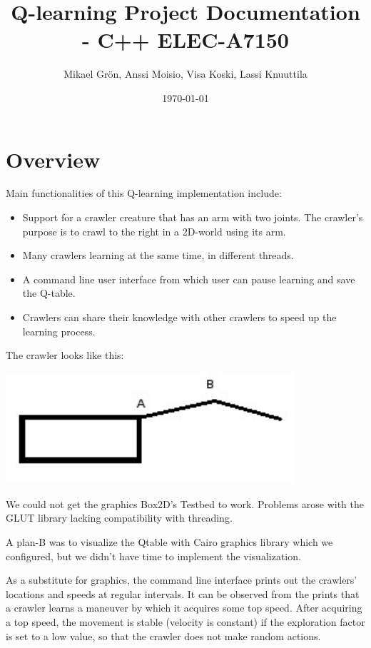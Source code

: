 \documentclass{article}
\author{Mikael Grön, Anssi Moisio, Visa Koski, Lassi Knuuttila}
\title{Q-learning Project Documentation - C++ ELEC-A7150}
\date{\today}
\begin{document}
\maketitle

\tableofcontents
\newpage

\section{Overview}
Main functionalities of this Q-learning implementation include:
\begin{itemize}
  \item Support for a crawler creature that has an arm with two joints. The
  crawler's purpose is to crawl to the right in a 2D-world using its arm.
  \item Many crawlers learning at the same time, in different threads.
  \item A command line user interface from which user can pause learning and
  save the Q-table.
  \item Crawlers can share their knowledge with other crawlers to speed up
  the learning process.
\end{itemize}

The crawler looks like this:

\includegraphics[width=0.8\textwidth]{simple_agent}

We could not get the graphics Box2D's Testbed to work. Problems arose with
the GLUT library lacking compatibility with threading.

A plan-B was to visualize the Qtable with Cairo graphics library which we
configured, but we didn't have time to implement the visualization.

As a substitute for graphics, the command line interface prints out the
crawlers’ locations and speeds at regular intervals. It can be observed
from the prints that a crawler learns a maneuver by which it acquires some
top speed. After acquiring a top speed, the movement is stable (velocity is
constant) if the exploration factor is set to a low value, so that the crawler
does not make random actions.
\end{document}
